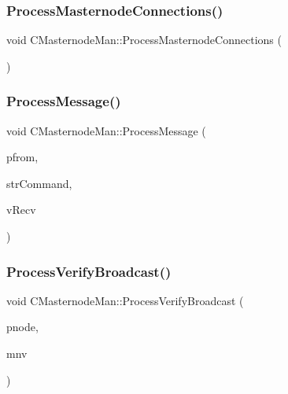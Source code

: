 \mbox{\label{class_c_masternode_man_ad8a9994f53e2d6385b8caba4cd5ee4b9}} 
\subsubsection{\texorpdfstring{Process\+Masternode\+Connections()}{ProcessMasternodeConnections()}}
{\footnotesize\ttfamily void C\+Masternode\+Man\+::\+Process\+Masternode\+Connections (\begin{DoxyParamCaption}{ }\end{DoxyParamCaption})}

\mbox{\label{class_c_masternode_man_ae3e5d263cebdcd932eca49caeadce9aa}} 
\subsubsection{\texorpdfstring{Process\+Message()}{ProcessMessage()}}
{\footnotesize\ttfamily void C\+Masternode\+Man\+::\+Process\+Message (\begin{DoxyParamCaption}\item[{\mbox{\hyperlink{class_c_node}{C\+Node}} $\ast$}]{pfrom,  }\item[{std\+::string \&}]{str\+Command,  }\item[{\mbox{\hyperlink{class_c_data_stream}{C\+Data\+Stream}} \&}]{v\+Recv }\end{DoxyParamCaption})}

\mbox{\label{class_c_masternode_man_a0731112eab2636186ca00f01bedd723e}} 
\subsubsection{\texorpdfstring{Process\+Verify\+Broadcast()}{ProcessVerifyBroadcast()}}
{\footnotesize\ttfamily void C\+Masternode\+Man\+::\+Process\+Verify\+Broadcast (\begin{DoxyParamCaption}\item[{\mbox{\hyperlink{class_c_node}{C\+Node}} $\ast$}]{pnode,  }\item[{const \mbox{\hyperlink{class_c_masternode_verification}{C\+Masternode\+Verification}} \&}]{mnv }\end{DoxyParamCaption})}

